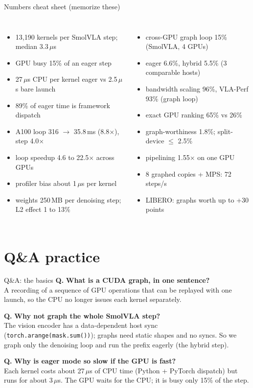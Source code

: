 \documentclass[aspectratio=169,10pt]{beamer}
\newcommand{\qa}[2]{\textbf{\textcolor{accent}{Q.}} \textbf{#1}\\[0.2em]{\small #2}\par\medskip}
\begin{document}
\begin{frame}{Numbers cheat sheet (memorize these)}
\small
\begin{columns}[T]
\begin{itemize}
\item 13,190 kernels per SmolVLA step; median 3.3\,$\mu$s
\item GPU busy 15\% of an eager step
\item 27\,$\mu$s CPU per kernel eager vs 2.5\,$\mu$s bare launch
\item 89\% of eager time is framework dispatch
\item A100 loop 316 $\rightarrow$ 35.8\,ms (8.8$\times$), step 4.0$\times$
\item loop speedup 4.6 to 22.5$\times$ across GPUs
\item profiler bias about 1\,$\mu$s per kernel
\item weights 250\,MB per denoising step; L2 effect 1 to 13\%
\end{itemize}
\begin{itemize}
\item cross-GPU graph loop 15\% (SmolVLA, 4 GPUs)
\item eager 6.6\%, hybrid 5.5\% (3 comparable hosts)
\item bandwidth scaling 96\%, VLA-Perf 93\% (graph loop)
\item exact GPU ranking 65\% vs 26\%
\item graph-worthiness 1.8\%; split-device $\leq$ 2.5\%
\item pipelining 1.55$\times$ on one GPU
\item 8 graphed copies + MPS: 72 steps/s
\item LIBERO: graphs worth up to +30 points
\end{itemize}
\end{columns}
\end{frame}

\section{Q\&A practice}

\begin{frame}{Q\&A: the basics}
\qa{What is a CUDA graph, in one sentence?}{A recording of a sequence of GPU operations that
can be replayed with one launch, so the CPU no longer issues each kernel separately.}
\qa{Why not graph the whole SmolVLA step?}{The vision encoder has a data-dependent host sync
(\texttt{torch.arange(mask.sum())}); graphs need static shapes and no syncs. So we graph only the
denoising loop and run the prefix eagerly (the hybrid step).}
\qa{Why is eager mode so slow if the GPU is fast?}{Each kernel costs about 27\,$\mu$s of CPU
time (Python + PyTorch dispatch) but runs for about 3\,$\mu$s. The GPU waits for the CPU; it is
busy only 15\% of the step.}
\end{frame}
\end{document}
